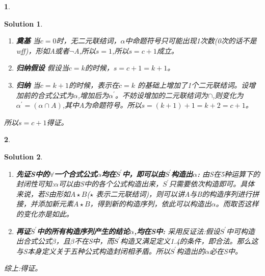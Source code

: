 \documentclass[UTF8,10pt,a4paper]{article}
\theoremstyle{Problem}
\newtheorem{prob}{}
\theoremstyle{Solution}
\newtheorem*{sol}{Solution}
\begin{document}
	\begin{prob}
		
	\end{prob}
	
	\begin{sol}
		\begin{enumerate}
			\item {\bf 奠基} 当$c = 0$时，无二元联结词，$\alpha$中命题符号只可能出现1次数(0次的话不是wff)，形如A或者$\neg$A,所以$s = 1$,所以$s = c + 1$成立。
			\item {\bf 归纳假设} 假设当$c = k$的时候，$s = c + 1 = k + 1$。
			\item {\bf 归纳} 当$c = k + 1$的时候，表示在$ c = k$ 的基础上增加了1个二元联结词。设增加前的合式公式为$\alpha$,增加后为$\alpha^\prime$。不妨设增加的二元联结词为$\cap$,则变化为 $\alpha^\prime = (\alpha \cap A)$,其中A为命题符号。所以$s = (k+1)+1 = k + 2 = c + 1$。		
		\end{enumerate}
		所以$s = c + 1$得证。
	\end{sol}

	\begin{prob}
		
	\end{prob}
	
	\begin{sol}
		\begin{enumerate}
			\item {\bf 先证S中的$\forall$一个合式公式$\alpha$均在$S^\prime$中，即可以由$S^\prime$构造出$\alpha$:} 由S在5种运算下的封闭性可知:$\alpha$可以由S中的各个公式构造出来，$S^\prime$只需要依次构造即可。具体来说，若S由形如$A \star B$($\star$ 表示二元联结词)，则可以讲A与B的构造序列进行拼接，并添加新元素$A \star B$，得到新的构造序列，依此可以构造出$\alpha$。而取否这样的变化亦是如此。
			\item {\bf 再证$S^\prime$中的所有构造序列产生的结论$\alpha$,均在S中:} 采用反证法:假设$S^\prime$中可构造出合式公式$\beta$，且$\beta$不在S中，而$S^\prime$构造又满足定义1.4的条件，即合法。那么这与S本身定义关于五种公式构造封闭相矛盾。所以$S^\prime$构造出的$\alpha$必在S中。
		\end{enumerate}
		综上:得证。
	\end{sol}
\end{document}
